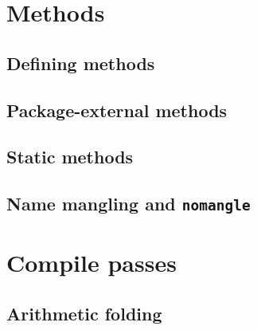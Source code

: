 \documentclass{article}
\begin{document}
\section{Methods}
\label{sec:methods}

\subsection{Defining methods}
\label{sub:methods:definition}

\subsection{Package-external methods}
\label{sub:methods:extern}

\subsection{Static methods}
\label{sub:methods:static}

\subsection{Name mangling and \texttt{nomangle}}
\label{sub:methods:mangle}

\section{Compile passes}
\label{sec:passes}

\subsection{Arithmetic folding}
\label{sub:passes:arithfold}
\end{document}
